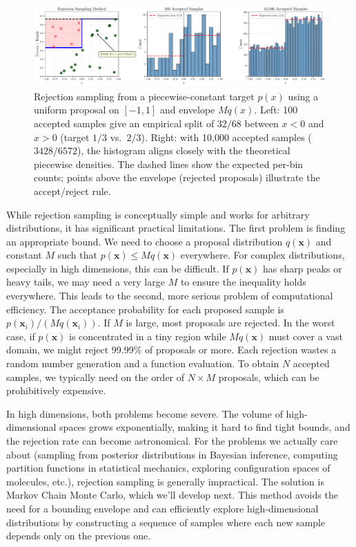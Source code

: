 \begin{figure}[htbp]
    \centering
    \includegraphics[width=.98\textwidth]{./figs/monte-carlo/rejection_convergence.pdf}
    \caption{Rejection sampling from a piecewise-constant target $p(x)$ using a uniform proposal on $[-1,1]$ and envelope $Mq(x)$. Left: 100 accepted samples give an empirical split of $32/68$ between $x<0$ and $x>0$ (target $1/3$ vs.\ $2/3$). Right: with 10{,}000 accepted samples ($3428/6572$), the histogram aligns closely with the theoretical piecewise densities. The dashed lines show the expected per-bin counts; points above the envelope (rejected proposals) illustrate the accept/reject rule.}
    \label{fig:rejection-convergence}
\end{figure}

While rejection sampling is conceptually simple and works for arbitrary distributions, it has significant practical limitations. The first problem is finding an appropriate bound. We need to choose a proposal distribution $q(\mathbf{x})$ and constant $M$ such that $p(\mathbf{x}) \le M q(\mathbf{x})$ everywhere. For complex distributions, especially in high dimensions, this can be difficult. If $p(\mathbf{x})$ has sharp peaks or heavy tails, we may need a very large $M$ to ensure the inequality holds everywhere. This leads to the second, more serious problem of computational efficiency. The acceptance probability for each proposed sample is $p(\mathbf{x}_i)/(M q(\mathbf{x}_i))$. If $M$ is large, most proposals are rejected. In the worst case, if $p(\mathbf{x})$ is concentrated in a tiny region while $M q(\mathbf{x})$ must cover a vast domain, we might reject 99.99\% of proposals or more. Each rejection wastes a random number generation and a function evaluation. To obtain $N$ accepted samples, we typically need on the order of $N \times M$ proposals, which can be prohibitively expensive.

In high dimensions, both problems become severe. The volume of high-dimensional spaces grows exponentially, making it hard to find tight bounds, and the rejection rate can become astronomical. For the problems we actually care about (sampling from posterior distributions in Bayesian inference, computing partition functions in statistical mechanics, exploring configuration spaces of molecules, etc.), rejection sampling is generally impractical. The solution is Markov Chain Monte Carlo, which we'll develop next. This method avoids the need for a bounding envelope and can efficiently explore high-dimensional distributions by constructing a sequence of samples where each new sample depends only on the previous one.

